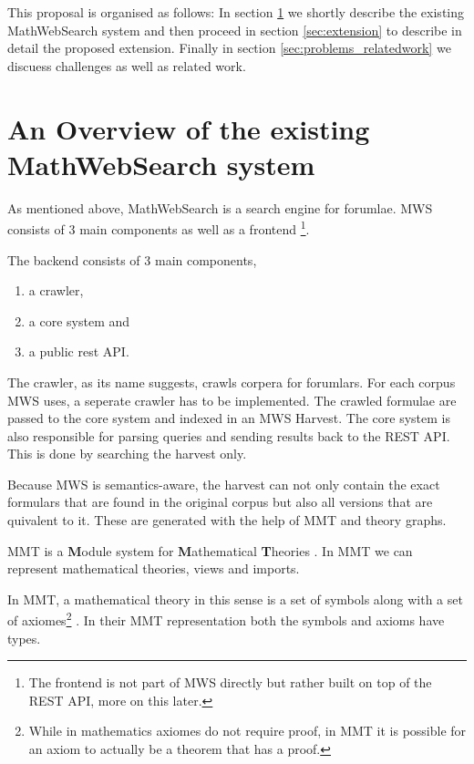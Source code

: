 \documentclass[11pt]{article}
\begin{document}
This proposal is organised as follows: In section \ref{sec:mws} we shortly describe the existing MathWebSearch system and then proceed in section \ref{sec:extension} to describe in detail the proposed extension. Finally in section \ref{sec:problems_relatedwork} we discuess challenges as well as related work.

\section{An Overview of the existing MathWebSearch system}
\label{sec:mws}

As mentioned above, MathWebSearch is a search engine for forumlae. MWS consists of 3 main components as well as a frontend \footnote{The frontend is not part of MWS directly but rather built on top of the REST API, more on this later. }\cite{KohPro:MWSmanual}.

The backend consists of 3 main components,
\begin{enumerate}
  \item a crawler,
  \item a core system and
  \item a public rest API.
\end{enumerate}

The crawler, as its name suggests, crawls corpera for forumlars. For each corpus MWS uses, a seperate crawler has to be implemented. The crawled formulae are passed to the core system and indexed in an MWS Harvest. The core system is also responsible for parsing queries and sending results back to the REST API. This is done by searching the harvest only.

Because MWS is semantics-aware, the harvest can not only contain the exact formulars that are found in the original corpus but also all versions that are quivalent to it. These are generated with the help of MMT and theory graphs.

MMT is a \textbf{M}odule system for \textbf{M}athematical \textbf{T}heories \cite{RabKoh:WSMSML13}. In MMT we can represent mathematical theories, views and imports.

In MMT, a mathematical theory in this sense is a set of symbols along with a set of axiomes\footnote{While in mathematics axiomes do not require proof, in MMT it is possible for an axiom to actually be a theorem that has a proof. } . In their MMT representation both the symbols and axioms have types.
\end{document}
